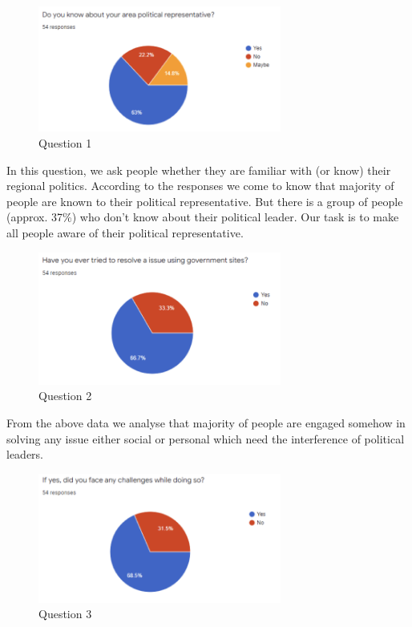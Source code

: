 \documentclass[acmtog]{acmart}
\begin{document}
\begin{figure}[H]
    \includegraphics[width=8cm]{Resources/q1}
    \caption{Question 1}
    \label{fig:q1}
\end{figure}

In this question, we ask people whether they are familiar with (or know) their regional politics. According to the responses we come to know that majority of people are known to their political representative. But there is a group of people (approx. 37\%) who don’t know about their political leader. Our task is to make all people aware of their political representative.

\begin{figure}[H]
    \includegraphics[width=8cm]{Resources/q2}
    \caption{Question 2}
    \label{fig:q2}
\end{figure}

From the above data we analyse that majority of people are engaged somehow in solving any issue either social or personal which need the interference of political leaders.

\begin{figure}[H]
    \includegraphics[width=8cm]{Resources/q3}
    \caption{Question 3}
    \label{fig:q3}
\end{figure}
\end{document}
